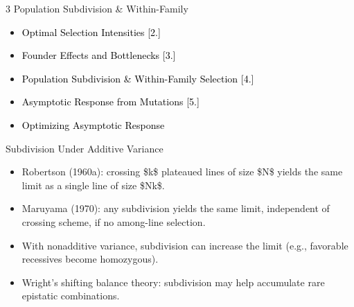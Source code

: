 \documentclass[10pt, aspectratio=169]{ctexbeamer}
\begin{document}
\begin{frame}{3 Population Subdivision \& Within-Family}
  \vfill
  \begin{center}
    \begin{minipage}{0.7\textwidth}
      \begin{itemize}
        \setlength{\itemsep}{0.3\baselineskip}
        \item[\textcolor{black}{\textbf{1.}}] \textcolor{black}{Optimal Selection Intensities [2.]}
        \item[\textcolor{black}{\textbf{2.}}] \textcolor{black}{Founder Effects and Bottlenecks [3.]}
        \item[\textcolor{black}{\textbf{3.}}] \textcolor{black}{Population Subdivision \& Within-Family Selection [4.]}
        \item[\textcolor{black}{\textbf{4.}}] \textcolor{black}{Asymptotic Response from Mutations [5.]}
        \item[\textcolor{black}{\textbf{5.}}] \textcolor{black}{Optimizing Asymptotic Response}
      \end{itemize}
    \end{minipage}
  \end{center}
  \vfill
\end{frame}

\begin{frame}{Subdivision Under Additive Variance}
  \begin{itemize}
    \item Robertson (1960a): crossing \$k\$ plateaued lines of size \$N\$ yields the same limit as a single line of size \$Nk\$.
    \item Maruyama (1970): any subdivision yields the same limit, independent of crossing scheme, if no among-line selection.
    \item With nonadditive variance, subdivision can increase the limit (e.g., favorable recessives become homozygous).
    \item Wright's shifting balance theory: subdivision may help accumulate rare epistatic combinations.
  \end{itemize}
\end{frame}
\end{document}
